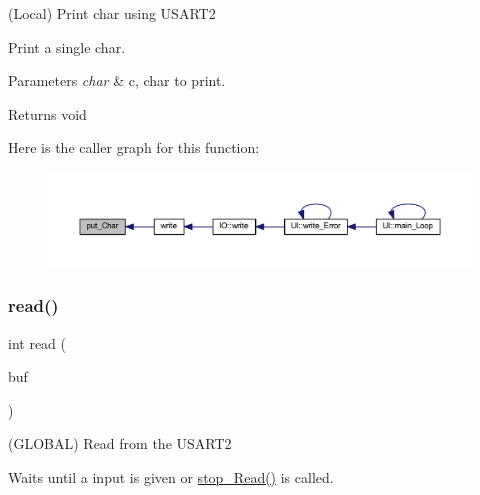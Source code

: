 (Local) Print char using U\+S\+A\+R\+T2 

Print a single char.


\begin{DoxyParams}{Parameters}
{\em char} & c, char to print. \\
\hline
\end{DoxyParams}
\begin{DoxyReturn}{Returns}
void 
\end{DoxyReturn}
Here is the caller graph for this function\+:\nopagebreak
\begin{figure}[H]
\begin{center}
\leavevmode
\includegraphics[width=350pt]{namespace_u_a_r_t_ae9667edee69ced0a5f4ada356f4a4fa1_icgraph}
\end{center}
\end{figure}
\mbox{\label{namespace_u_a_r_t_a1087fba97ca797e5ca155228ff9eec55}} 
\subsubsection{\texorpdfstring{read()}{read()}}
{\footnotesize\ttfamily int read (\begin{DoxyParamCaption}\item[{char $\ast$}]{buf }\end{DoxyParamCaption})}



(G\+L\+O\+B\+AL) Read from the U\+S\+A\+R\+T2 

Waits until a input is given or \mbox{\hyperlink{namespace_u_a_r_t_a996ffefd3d2ce666720596342364db03}{stop\+\_\+\+Read()}} is called.


